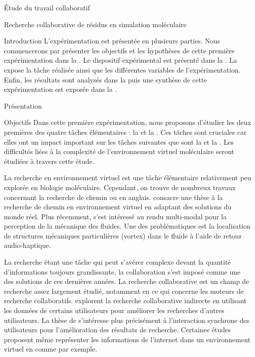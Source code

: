 \documentclass[myfrancais]{mythesis}
\begin{document}
\begin{mypart}{Étude du travail collaboratif}
\begin{mychapter}{Recherche collaborative de résidus en simulation moléculaire}
\begin{mysection}{Introduction}
				L'expérimentation est présentée en plusieurs parties.
				Nous commencerons par présenter les objectifs et les hypothèses de cette première expérimentation dans la .
				Le dispositif expérimental est présenté dans la .
				La  expose la tâche réalisée ainsi que les différentes variables de l'expérimentation.
				Enfin, les résultats sont analysés dans la  puis une synthèse de cette expérimentation est exposée dans la .
			\end{mysection}
			\begin{mysection}{Présentation}
				\begin{mysubsection}{Objectifs}
					Dans cette première expérimentation, nous proposons d'étudier les deux premières des quatre tâches élémentaires : la  et la .
					Ces tâches sont cruciales car elles ont un impact important sur les tâches suivantes que sont la  et la .
					Les difficultés liées à la complexité de l'environnement virtuel moléculaire seront étudiées à travers cette étude.

					La recherche en environnement virtuel est une tâche élémentaire relativement peu explorée en biologie moléculaire.
					Cependant, on trouve de nombreux travaux concernant la \og recherche de chemin \fg ou  en anglais.
					 consacre une thèse à la recherche de chemin en environnement virtuel en adaptant des solutions du monde réel.
					Plus récemment,  s'est intéressé au rendu multi-modal pour la perception de la mécanique des fluides.
					Une des problématiques est la localisation de structures mécaniques particulières (vortex) dans le fluide à l'aide de retour audio-haptique.

					La recherche étant une tâche qui peut s'avérer complexe devant la quantité d'informations toujours grandissante, la collaboration s'est imposé comme une des solutions de ces dernières années.
					La recherche collaborative est un champ de recherche assez largement étudié, notamment en ce qui concerne les moteurs de recherche collaboratifs.
					 explorent la recherche collaborative indirecte en utilisant les données de certains utilisateurs pour améliorer les recherches d'autres utilisateurs.
					La thèse de  s'intéresse plus précisément à l'interaction synchrone des utilisateurs pour l'amélioration des résultats de recherche.
					Certaines études proposent même représenter les informations de l'internet dans un environnement virtuel en \myThreeD comme  par exemple.


\end{mysubsection}
\end{mysection}
\end{mychapter}
\end{mypart}
\end{document}
